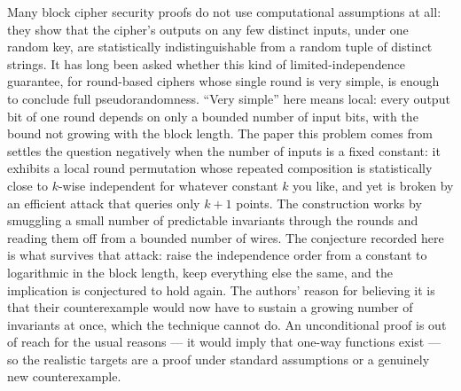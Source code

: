 \documentclass{conjura-conjecture}
\begin{document}

\vspace{0.4em}

\begin{informalconjecture}
Many block cipher security proofs do not use computational assumptions
at all: they show that the cipher's outputs on any few distinct inputs,
under one random key, are statistically indistinguishable from a random
tuple of distinct strings. It has long been asked whether this kind of
limited-independence guarantee, for round-based ciphers whose single
round is very simple, is enough to conclude full pseudorandomness.
``Very simple'' here means local: every output bit of one round depends
on only a bounded number of input bits, with the bound not growing with
the block length. The paper this problem comes from settles the question
negatively when the number of inputs is a fixed constant: it exhibits a
local round permutation whose repeated composition is statistically
close to $k$-wise independent for whatever constant $k$ you like, and
yet is broken by an efficient attack that queries only $k+1$ points. The
construction works by smuggling a small number of predictable invariants
through the rounds and reading them off from a bounded number of wires.
The conjecture recorded here is what survives that attack: raise the
independence order from a constant to logarithmic in the block length,
keep everything else the same, and the implication is conjectured to
hold again. The authors' reason for believing it is that their
counterexample would now have to sustain a growing number of invariants
at once, which the technique cannot do. An unconditional proof is out of
reach for the usual reasons --- it would imply that one-way functions
exist --- so the realistic targets are a proof under standard
assumptions or a genuinely new counterexample.
\end{informalconjecture}
\end{document}
